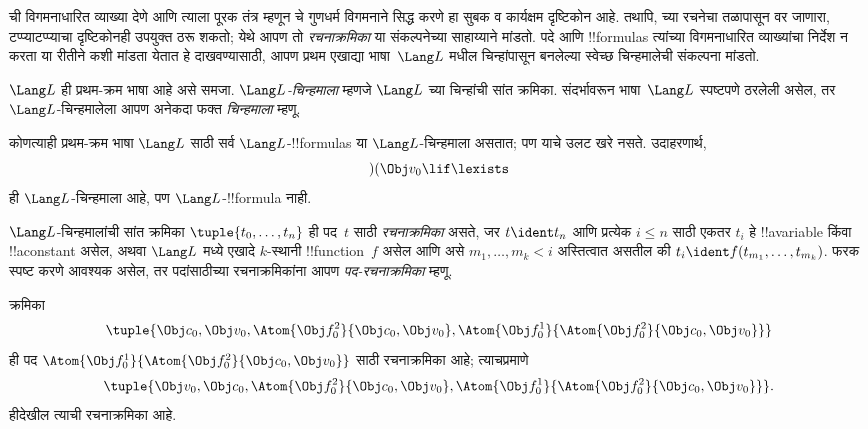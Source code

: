 \documentclass[../../../include/open-logic-section]{subfiles}
\begin{document}


ची विगमनाधारित व्याख्या देणे आणि त्याला पूरक तंत्र म्हणून
चे गुणधर्म विगमनाने सिद्ध करणे हा सुबक व कार्यक्षम
दृष्टिकोन आहे. तथापि, च्या रचनेचा तळापासून वर जाणारा,
टप्प्याटप्प्याचा दृष्टिकोनही उपयुक्त ठरू शकतो; येथे आपण तो
\emph{रचनाक्रमिका} या संकल्पनेच्या साहाय्याने मांडतो.
%
पदे आणि !!{formula}s त्यांच्या विगमनाधारित व्याख्यांचा निर्देश न करता
या रीतीने कशी मांडता येतात हे दाखवण्यासाठी, आपण प्रथम एखाद्या
भाषा~$\Lang L$ मधील चिन्हांपासून बनलेल्या स्वेच्छ चिन्हमालेची संकल्पना
मांडतो.

\begin{defn}[चिन्हमाला]
$\Lang L$ ही प्रथम-क्रम भाषा आहे असे समजा. \emph{$\Lang L$-चिन्हमाला}
म्हणजे $\Lang L$ च्या चिन्हांची सांत क्रमिका. संदर्भावरून भाषा~$\Lang L$
स्पष्टपणे ठरलेली असेल, तर $\Lang L$-चिन्हमालेला आपण अनेकदा फक्त
\emph{चिन्हमाला} म्हणू.
\end{defn}

\begin{ex}
कोणत्याही प्रथम-क्रम भाषा $\Lang L$ साठी सर्व $\Lang L$-!!{formula}s
या $\Lang L$-चिन्हमाला असतात; पण याचे उलट खरे नसते. उदाहरणार्थ,
\[)(\Obj v_0\lif\lexists\] ही $\Lang L$-चिन्हमाला आहे, पण
$\Lang L$-!!{formula} नाही.
\end{ex}

\begin{defn}[पदांसाठी रचनाक्रमिका]
\raggedright
$\Lang L$-चिन्हमालांची सांत क्रमिका $\tuple{t_0,\dotsc,t_n}$ ही पद~$t$
साठी \emph{रचनाक्रमिका} असते, जर $t \ident t_n$ आणि प्रत्येक $i \leq n$
साठी एकतर $t_i$ हे !!a{variable} किंवा !!a{constant} असेल, अथवा $\Lang
L$ मध्ये एखादे $k$-स्थानी !!{function}~$f$ असेल आणि असे
$m_1,\dotsc,m_k < i$ अस्तित्वात असतील की
$t_i \ident f(t_{m_1},\dotsc,t_{m_k})$. फरक स्पष्ट करणे आवश्यक असेल,
तर पदांसाठीच्या रचनाक्रमिकांना आपण \emph{पद-रचनाक्रमिका} म्हणू.
%
\end{defn}

\begin{ex}
क्रमिका
\[
    \tuple{\Obj c_0, \Obj v_0, \Atom{\Obj f^2_0}{\Obj c_0, \Obj v_0}, \Atom{\Obj f^1_0}{\Atom{\Obj f^2_0}{\Obj c_0, \Obj v_0}}}
\]
ही पद $\Atom{\Obj f^1_0}{\Atom{\Obj
f^2_0}{\Obj c_0, \Obj v_0}}$ साठी रचनाक्रमिका आहे; त्याचप्रमाणे
\[
    \tuple{\Obj v_0, \Obj c_0, \Atom{\Obj f^2_0}{\Obj c_0, \Obj v_0}, \Atom{\Obj f^1_0}{\Atom{\Obj f^2_0}{\Obj c_0, \Obj v_0}}}.
\]
हीदेखील त्याची रचनाक्रमिका आहे.
\end{ex}
\end{document}
